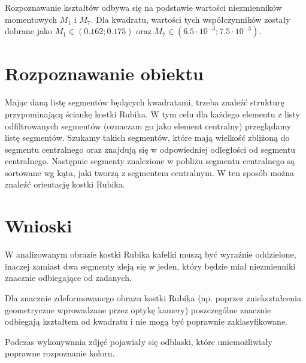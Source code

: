 \documentclass[12pt,a4paper]{article}
\begin{document}
Rozpoznawanie kształtów odbywa się na podstawie wartości niezmienników momentowych $M_1$ i $M_7$. Dla kwadratu, wartości tych współczynników zostały dobrane jako $M_1 \in (0.162; 0.175)$ oraz $M_7 \in (6.5 \cdot 10^{-3}; 7.5 \cdot 10^{-3})$.

\section{Rozpoznawanie obiektu}

Mając daną listę segmentów będących kwadratami, trzeba znaleźć strukturę przypominającą ściankę kostki Rubika. W tym celu dla każdego elementu z listy odfiltrowanych segmentów (oznaczam go jako element centralny) przeglądamy listę segmentów. Szukamy takich segmentów, które mają wielkość zbliżoną do segmentu centralnego oraz znajdują się w odpowiedniej odległości od segmentu centralnego. Następnie segmenty znalezione w pobliżu segmentu centralnego są sortowane wg kąta, jaki tworzą z segmentem centralnym. W ten sposób można znaleźć orientację kostki Rubika.

\section{Wnioski}
W analizowanym obrazie kostki Rubika kafelki muszą być wyraźnie oddzielone, inaczej zamiast dwa segmenty zleją się w jeden, który będzie miał niezmienniki znacznie odbiegające od zadanych. 

Dla znacznie zdeformowanego obrazu kostki Rubika (np. poprzez zniekształcenia geometryczne wprowadzane przez optykę kamery) poszczególne znacznie odbiegają kształtem od kwadratu i nie mogą być poprawnie zaklasyfikowane.

Podczas wykonywania zdjęć pojawiały się odblaski, które uniemożliwiały poprawne rozpoznanie koloru.
	
\end{document}
